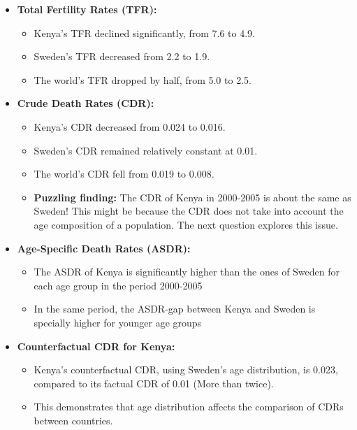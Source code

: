 \documentclass[12pt]{article}
\begin{document}
{\begin{itemize}
    \item \textbf{Total Fertility Rates (TFR):}
    \begin{itemize}
        \item Kenya’s TFR declined significantly, from 7.6 to 4.9.
        \item Sweden’s TFR decreased from 2.2 to 1.9.
        \item The world’s TFR dropped by half, from 5.0 to 2.5.
    \end{itemize}

    \item \textbf{Crude Death Rates (CDR):}
    \begin{itemize}
        \item Kenya’s CDR decreased from 0.024 to 0.016.
        \item Sweden’s CDR remained relatively constant at 0.01.
        \item The world’s CDR fell from 0.019 to 0.008.
        \item \textbf{Puzzling finding:} The CDR of Kenya in 2000-2005 is about the same as Sweden! This might be because the CDR does not take into account the age composition of a population. The next question explores this issue.
    \end{itemize}

    \item \textbf{Age-Specific Death Rates (ASDR):}
    \begin{itemize}
        \item The ASDR of Kenya is significantly higher than the ones of Sweden for each age group in the period 2000-2005
        \item In the same period, the ASDR-gap between Kenya and Sweden is specially higher for younger age groups
    \end{itemize}

    \item \textbf{Counterfactual CDR for Kenya:}
    \begin{itemize}
        \item Kenya’s counterfactual CDR, using Sweden’s age distribution, is 0.023, compared to its factual CDR of 0.01 (More than twice). 
        \item This demonstrates that age distribution affects the comparison of CDRs between countries.
    \end{itemize}
\end{itemize}
}
\end{document}
